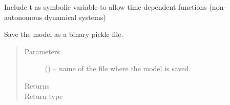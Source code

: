 \documentclass[letterpaper,10pt,english]{sphinxmanual}
\begin{document}
\begin{fulllineitems}
\begin{description}
Include t as symbolic variable to allow time dependent functions (non-autonomous dynamical systems)

\end{description}

\begin{fulllineitems}
\label{\detokenize{triflow.core:triflow.core.model.Model.fields_template}}
\end{fulllineitems}


\begin{fulllineitems}
\label{\detokenize{triflow.core:triflow.core.model.Model.sargs}}
\end{fulllineitems}


\begin{fulllineitems}
\label{\detokenize{triflow.core:triflow.core.model.Model.save}}
Save the model as a binary pickle file.
\begin{quote}\begin{description}
\item[{Parameters}] \leavevmode
{} () -- name of the file where the model is saved.

\item[{Returns}] \leavevmode


\item[{Return type}] \leavevmode
{}

\end{description}\end{quote}

\end{fulllineitems}


\end{fulllineitems}

\end{document}
